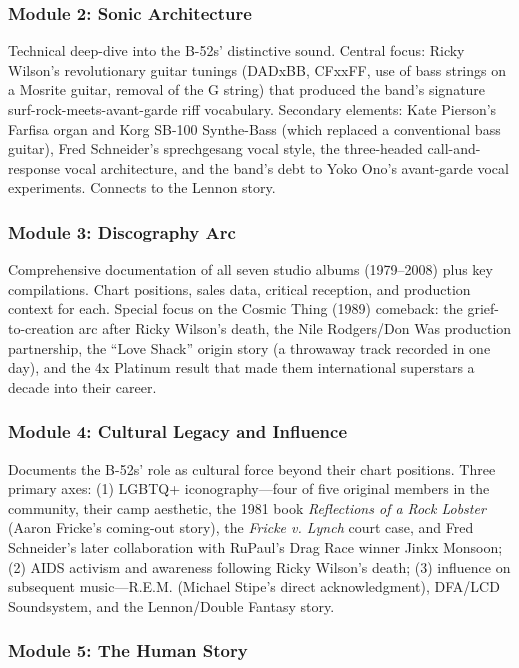 \documentclass[11pt,letterpaper]{article}
\begin{document}
\subsubsection{Module 2: Sonic Architecture}

Technical deep-dive into the B-52s' distinctive sound. Central focus: Ricky Wilson's revolutionary guitar tunings (DADxBB, CFxxFF, use of bass strings on a Mosrite guitar, removal of the G string) that produced the band's signature surf-rock-meets-avant-garde riff vocabulary. Secondary elements: Kate Pierson's Farfisa organ and Korg SB-100 Synthe-Bass (which replaced a conventional bass guitar), Fred Schneider's sprechgesang vocal style, the three-headed call-and-response vocal architecture, and the band's debt to Yoko Ono's avant-garde vocal experiments. Connects to the Lennon story.

\subsubsection{Module 3: Discography Arc}

Comprehensive documentation of all seven studio albums (1979--2008) plus key compilations. Chart positions, sales data, critical reception, and production context for each. Special focus on the Cosmic Thing (1989) comeback: the grief-to-creation arc after Ricky Wilson's death, the Nile Rodgers/Don Was production partnership, the ``Love Shack'' origin story (a throwaway track recorded in one day), and the 4x Platinum result that made them international superstars a decade into their career.

\subsubsection{Module 4: Cultural Legacy and Influence}

Documents the B-52s' role as cultural force beyond their chart positions. Three primary axes: (1) LGBTQ+ iconography---four of five original members in the community, their camp aesthetic, the 1981 book \textit{Reflections of a Rock Lobster} (Aaron Fricke's coming-out story), the \textit{Fricke v. Lynch} court case, and Fred Schneider's later collaboration with RuPaul's Drag Race winner Jinkx Monsoon; (2) AIDS activism and awareness following Ricky Wilson's death; (3) influence on subsequent music---R.E.M. (Michael Stipe's direct acknowledgment), DFA/LCD Soundsystem, and the Lennon/Double Fantasy story.

\subsubsection{Module 5: The Human Story}
\end{document}
